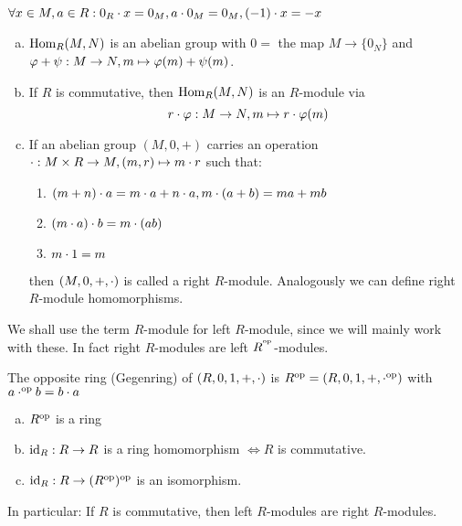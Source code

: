\documentclass[a4paper]{report}
\begin{document}
\begin{facts}[Excers.]$\forall x \in M, a \in R: 0_{R} \cdot x = 0_{M}, a \cdot 0_{M} = 0_{M}, (-1)\cdot x = -x$
\end{facts}
\begin{rem}[Excers.]
\begin{enumerate}[(a)]
  \item $\operatorname{Hom}_{R}(M,N)$ is an abelian group with $0 =$ the map $M \to \{0_{N}\}$ and $\varphi + \psi: M \to N, m \mapsto \varphi(m)+\psi(m)$.
  \item If $R$ is commutative, then $\operatorname{Hom}_{R}(M,N)$ is an $R$-module via \[r \cdot \varphi : M \to N, m \mapsto r \cdot \varphi(m)\]
  \item If an abelian group $(M,0,+)$ carries an operation $\cdot: M \times R \to M, (m,r) \mapsto m \cdot r$ such that:
        \begin{enumerate}[(M1')]
          \item $(m+n) \cdot a = m \cdot a + n \cdot a, m \cdot (a+b) = ma + mb$
          \item $(m \cdot a)\cdot b = m \cdot (ab)$
                \item $m \cdot 1 = m$
        \end{enumerate}
then $(M,0,+,\cdot)$ is called a right $R$-module. Analogously we can define right $R$-module homomorphisms.
\end{enumerate}
\end{rem}
\begin{conv} We shall use the term $R$-module for left $R$-module, since we will mainly work with these. In fact right $R$-modules are left $R^{^\text{op}}$-modules.
\end{conv}
\begin{defi}
The opposite ring (Gegenring) of $(R,0,1,+,\cdot)$ is $R^\text{op} = (R,0,1,+,\cdot^\text{op})$ with $a \cdot^\text{op} b = b \cdot a$
\end{defi}
\begin{facts}[Excersize]
  \begin{enumerate}[(a)]
    \item $R^\text{op}$ is a ring
    \item $\operatorname{id}_{R}: R \to R$ is a ring homomorphism $\iff R$ is commutative.
    \item $\operatorname{id}_{R}: R \to (R^\text{op})^\text{op}$ is an isomorphism.
  \end{enumerate}
In particular: If $R$ is commutative, then left $R$-modules are right $R$-modules.
\end{facts}
\end{document}
